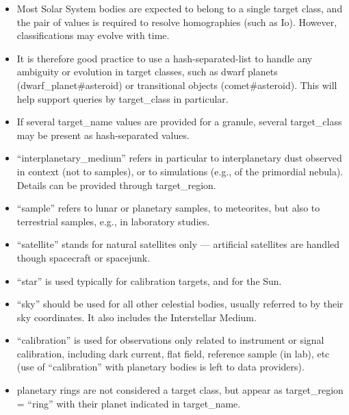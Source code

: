 \documentclass[11pt,a4paper]{ivoa}
\begin{document}
\begin{itemize}

\item Most Solar System bodies are expected to belong to a single target class,
and the pair of values is required to resolve homographies (such as Io).
However, classifications may evolve with time.

\item It is therefore good practice to use a hash-separated-list to
handle any ambiguity or evolution in target classes, such as dwarf
planets (dwarf\_planet\#asteroid) or transitional objects (comet\#asteroid).
This will help support queries by target\_class in particular.

\item If several target\_name values are provided for a granule,
several target\_class may be present as hash-separated values.

\item ``interplanetary\_medium'' refers in particular to interplanetary
dust observed in context (not to samples), or to simulations
(e.g., of the primordial nebula).
Details can be provided through target\_region.

\item ``sample'' refers to lunar or planetary samples, to meteorites,
but also to terrestrial samples, e.g., in laboratory studies.

\item ``satellite'' stands for natural satellites only --- artificial
satellites are handled though spacecraft or spacejunk.

\item ``star'' is used typically for calibration targets, and for the Sun.

\item ``sky'' should be used for all other celestial bodies,
usually referred to by their sky coordinates.
It also includes the Interstellar Medium.

\item ``calibration'' is used for observations only related to instrument
or signal calibration, including dark current, flat field, reference
sample (in lab), etc (use of ``calibration'' with planetary bodies is
left to data providers).

\item planetary rings are not considered a target class, but appear as
target\_region = ``ring'' with their planet indicated in target\_name.

\end{itemize}
\end{document}
